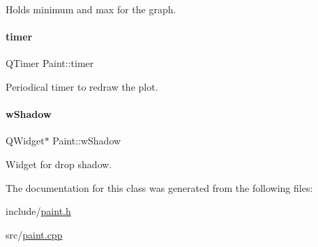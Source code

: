 Holds minimum and max for the graph. 

\mbox{\label{classPaint_a0cd2955c474cb99795506bdee2df71ab}} 
\paragraph{\texorpdfstring{timer}{timer}}
{\footnotesize\ttfamily Q\+Timer Paint\+::timer\hspace{0.3cm}{\ttfamily [private]}}



Periodical timer to redraw the plot. 

\mbox{\label{classPaint_a6263fca255c858e9cbf7f549392b9e9e}} 
\paragraph{\texorpdfstring{wShadow}{wShadow}}
{\footnotesize\ttfamily Q\+Widget$\ast$ Paint\+::w\+Shadow\hspace{0.3cm}{\ttfamily [private]}}



Widget for drop shadow. 



The documentation for this class was generated from the following files\+:\begin{DoxyCompactItemize}
\item 
include/\mbox{\hyperlink{paint_8h}{paint.\+h}}\item 
src/\mbox{\hyperlink{paint_8cpp}{paint.\+cpp}}\end{DoxyCompactItemize}
